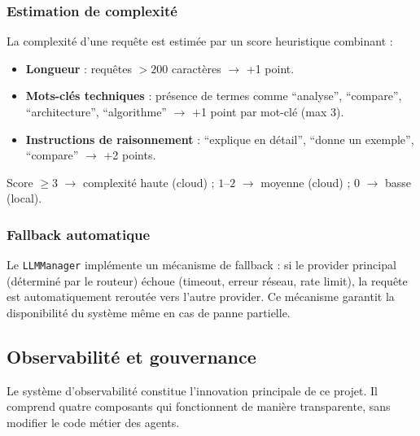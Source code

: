 \documentclass[12pt, a4paper]{article}
\begin{document}
\subsubsection{Estimation de complexité}

La complexité d'une requête est estimée par un score heuristique combinant :
\begin{itemize}
  \item \textbf{Longueur} : requêtes $> 200$ caractères $\rightarrow$ +1 point.
  \item \textbf{Mots-clés techniques} : présence de termes comme ``analyse'', ``compare'', ``architecture'', ``algorithme'' $\rightarrow$ +1 point par mot-clé (max 3).
  \item \textbf{Instructions de raisonnement} : ``explique en détail'', ``donne un exemple'', ``compare'' $\rightarrow$ +2 points.
\end{itemize}

Score $\geq 3$ $\rightarrow$ complexité haute (cloud) ; $1$--$2$ $\rightarrow$ moyenne (cloud) ; $0$ $\rightarrow$ basse (local).

\subsubsection{Fallback automatique}

Le \texttt{LLMManager} implémente un mécanisme de fallback : si le provider principal (déterminé par le routeur) échoue (timeout, erreur réseau, rate limit), la requête est automatiquement reroutée vers l'autre provider. Ce mécanisme garantit la disponibilité du système même en cas de panne partielle.

\subsection{Observabilité et gouvernance}

Le système d'observabilité constitue l'innovation principale de ce projet. Il comprend quatre composants qui fonctionnent de manière transparente, sans modifier le code métier des agents.
\end{document}
